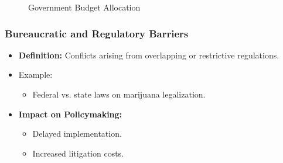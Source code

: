 \documentclass[10pt]{beamer}
\begin{document}
\begin{frame}
\begin{frame}
                    \begin{figure}
                        \centering
                        \caption{\scriptsize Government Budget Allocation}
                    \end{figure}
                \end{frame}
                
                \begin{frame}
                    \frametitle{Bureaucratic and Regulatory Barriers}
                    \begin{itemize}
                        \item \textbf{Definition:} Conflicts arising from overlapping or restrictive regulations.
                        \item Example:
                            \begin{itemize}
                                \item Federal vs. state laws on marijuana legalization.
                            \end{itemize}
                        \item \textbf{Impact on Policymaking:}
                            \begin{itemize}
                                \item Delayed implementation.
                                \item Increased litigation costs.
                            \end{itemize}
                    \end{itemize}
                    

\end{frame}
\end{frame}
\end{document}

